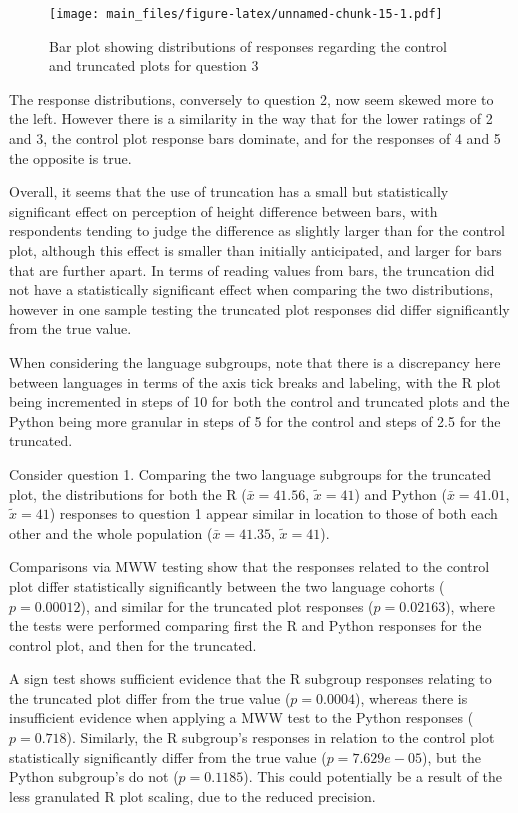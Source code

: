 \documentclass[
  11pt,
]{book}
\begin{document}
\begin{figure}
\centering
\texttt{[image: main\_files/figure-latex/unnamed-chunk-15-1.pdf]}
\caption{Bar plot showing distributions of responses regarding the
control and truncated plots for question 3}
\end{figure}

The response distributions, conversely to question 2, now seem skewed
more to the left. However there is a similarity in the way that for the
lower ratings of 2 and 3, the control plot response bars dominate, and
for the responses of 4 and 5 the opposite is true.

Overall, it seems that the use of truncation has a small but
statistically significant effect on perception of height difference
between bars, with respondents tending to judge the difference as
slightly larger than for the control plot, although this effect is
smaller than initially anticipated, and larger for bars that are further
apart. In terms of reading values from bars, the truncation did not have
a statistically significant effect when comparing the two distributions,
however in one sample testing the truncated plot responses did differ
significantly from the true value.

When considering the language subgroups, note that there is a
discrepancy here between languages in terms of the axis tick breaks and
labeling, with the R plot being incremented in steps of 10 for both the
control and truncated plots and the Python being more granular in steps
of 5 for the control and steps of 2.5 for the truncated.

Consider question 1. Comparing the two language subgroups for the
truncated plot, the distributions for both the R (\(\bar{x} = 41.56\),
\(\tilde{x} = 41\)) and Python (\(\bar{x} = 41.01\), \(\tilde{x} = 41\))
responses to question 1 appear similar in location to those of both each
other and the whole population (\(\bar{x} = 41.35\),
\(\tilde{x} = 41\)).

Comparisons via MWW testing show that the responses related to the
control plot differ statistically significantly between the two language
cohorts (\(p=0.00012\)), and similar for the truncated plot responses
(\(p=0.02163\)), where the tests were performed comparing first the R
and Python responses for the control plot, and then for the truncated.

A sign test shows sufficient evidence that the R subgroup responses
relating to the truncated plot differ from the true value
(\(p = 0.0004\)), whereas there is insufficient evidence when applying a
MWW test to the Python responses (\(p = 0.718\)). Similarly, the R
subgroup's responses in relation to the control plot statistically
significantly differ from the true value (\(p=7.629e-05\)), but the
Python subgroup's do not (\(p=0.1185\)). This could potentially be a
result of the less granulated R plot scaling, due to the reduced
precision.
\end{document}
